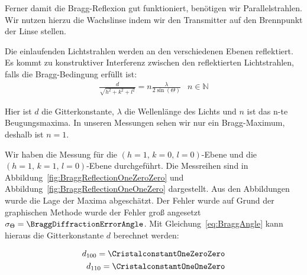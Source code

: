 \documentclass[a4paper,10pt,twocolumn]{article}
\begin{document}
    Ferner damit die Bragg-Reflexion gut funktioniert, benötigen wir Parallelstrahlen.
    Wir nutzen hierzu die Wachslinse indem wir den Transmitter auf den Brennpunkt der Linse stellen.
    
    Die einlaufenden Lichtstrahlen werden an den verschiedenen Ebenen reflektiert.
    Es kommt zu konstruktiver Interferenz zwischen den reflektierten Lichtstrahlen, falls die Bragg-Bedingung erfüllt
    ist:
    \begin{align}
        \label{eq:BraggAngle}
        \frac{d}{\sqrt{h^2+k^2+l^2}} = n \frac{\lambda}{2 \sin(\Theta)} & n \in \mathds{N}
    \end{align}
    
    Hier ist $d$ die Gitterkonstante, $\lambda$ die Wellenlänge des Lichts und $n$ ist das n-te Beugungsmaxima.
    In unseren Messungen sehen wir nur ein Bragg-Maximum, deshalb ist $n = 1$.
    
%    
    
    Wir haben die Messung für die $(h=1,\,k=0,\,l=0)$-Ebene und die $(h=1,\,k=1,\,l=0)$-Ebene durchgeführt.
    Die Messreihen sind in Abbildung~\ref{fig:BraggReflectionOneZeroZero} und Abbildung~\ref{fig:BraggReflectionOneOneZero}
    dargestellt.
    Aus den Abbildungen wurde die Lage der Maxima abgeschätzt.
    Der Fehler wurde auf Grund der graphischen Methode wurde der Fehler groß angesetzt $\sigma_{\Theta} = \BraggDiffractionErrorAngle$.
    Mit Gleichung~\ref{eq:BraggAngle} kann hieraus die Gitterkonstante $d$ berechnet werden:
    
    \begin{align*}
        d_{100} = \CristalconstantOneZeroZero \\
        d_{110} = \CristalconstantOneOneZero
    \end{align*}
    
\end{document}
